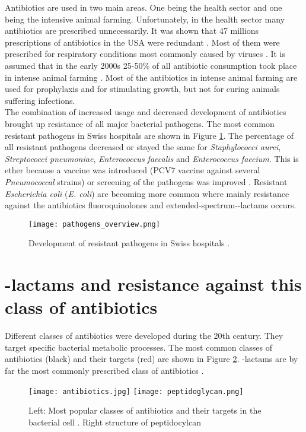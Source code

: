 Antibiotics are used in two main areas. One being the health sector and one being the intensive animal farming. Unfortunately, in the health sector many antibiotics are prescribed unnecessarily. It was shown that 47 millions prescriptions of antibiotics in the USA were redundant \cite{noauthor_antibiotic_2019}. Most of them were prescribed for respiratory conditions most commonly caused by viruses \cite{noauthor_antibiotic_2019}. It is assumed that in the early 2000s 25-50\% of all antibiotic consumption took place in intense animal farming  \cite{palumbi_humans_2001}. Most of the antibiotics in intense animal farming are used for prophylaxis and for stimulating growth, but not for curing animals suffering infections. \\
The combination of increased usage and decreased development of antibiotics brought up resistance of all major bacterial pathogens. The most common resistant pathogens in Swiss hospitals are shown in Figure \ref{figure:pathogen_dvelopment}. The percentage of all resistant pathogens decreased or stayed the same for \textit{Staphylococci aurei}, \textit{Streptococci pneumoniae}, \textit{Enterococcus faecalis} and \textit{Enterococcus faecium}. This is ether because a vaccine was introduced (PCV7 vaccine against several \textit{Pneumococcal} strains) or screening of the pathogens was improved \cite{swiss_hospitals_pathogens}. Resistant \textit{Escherichia coli} (\textit{E. coli}) are becoming more common where mainly resistance against the antibiotics fluoroquinolones and extended-spectrum-\textbeta-lactams occurs. \\

\begin{figure}
	\texttt{[image: pathogens\_overview.png]}
	\caption{Development of resistant pathogens in Swiss hospitals \cite{swiss_hospitals_pathogens}.}
	\label{figure:pathogen_dvelopment}
\end{figure}

\section{\textbeta-lactams and resistance against this class of antibiotics}
Different classes of antibiotics were developed during the 20th century. They target specific bacterial metabolic processes. The most common classes of antibiotics (black) and their targets (red) are shown in Figure \ref{figure:antibiotics}. \textbeta-lactams are by far the most commonly prescribed class of antibiotics \cite{blogger_guide_2019}.
\begin{figure}
	\texttt{[image: antibiotics.jpg]}
	\texttt{[image: peptidoglycan.png]}
	\caption{Left: Most popular classes of antibiotics and their targets in the bacterial cell \cite{wright_english:_2010}. Right structure of peptidocylcan \cite{illustrator_english:_nodate}}
	\label{figure:antibiotics}
\end{figure}

